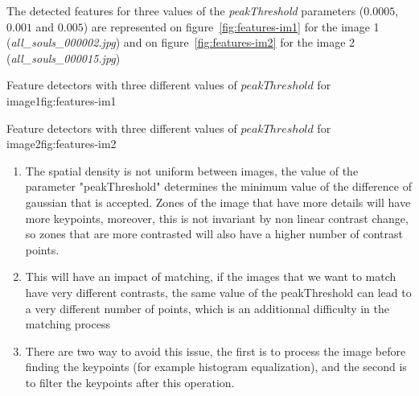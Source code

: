 \documentclass{article}
\begin{document}

The detected features for three values of the \emph{peakThreshold}
parameters ($0.0005$, $0.001$ and $0.005$) are represented on
figure~\ref{fig:features-im1} for the image 1
(\emph{all\_souls\_000002.jpg}) and on figure~\ref{fig:features-im2}
for the image 2 (\emph{all\_souls\_000015.jpg})

          {}
          {}
          {Feature detectors with three different values of $peakThreshold$ for image1}{fig:features-im1}

          {}
          {}
          {Feature detectors with three different values of $peakThreshold$ for image2}{fig:features-im2}


\begin{enumerate}

\item The spatial density is not uniform between images, the value of
the parameter "peakThreshold" determines the minimum value of the
difference of gaussian that is accepted.  Zones of the image that have
more details will have more keypoints, moreover, this is not invariant
by non linear contrast change, so zones that are more contrasted will
also have a higher number of contrast points.

\item This will have an impact of matching, if the images that we want to
match have very different contrasts, the same value of the peakThreshold
can lead to a very different number of points, which is an additionnal
difficulty in the matching process

\item There are two way to avoid this issue, the first is to process the
image before finding the keypoints (for example histogram
equalization), and the second is to filter the keypoints after this
operation.

\end{enumerate}
\end{document}
